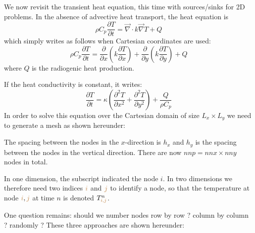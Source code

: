 We now revisit the transient heat equation, this time with sources/sinks for 2D problems.
In the absence of advective heat transport, the heat equation is 
\begin{equation}
\rho C_p \frac{\partial T}{\partial t} =
\vec\nabla \cdot k \vec\nabla T + Q 
\end{equation}
which simply writes as follows when Cartesian coordinates are used:
\begin{equation}
\rho C_p \frac{\partial T}{\partial t} = 
\frac{\partial }{\partial x} \left(  k  \frac{\partial T}{\partial x} \right)+
\frac{\partial }{\partial y} \left(  k  \frac{\partial T}{\partial y} \right)+ Q
\end{equation}
where $Q$ is the radiogenic heat production.

If the heat conductivity is constant, it writes:
\begin{equation}
\frac{\partial T}{\partial t} =
\kappa \left(  \frac{\partial^2 T}{\partial x^2} + \frac{\partial^2 T}{\partial y^2} \right)+
\frac{Q}{\rho C_p}
\end{equation}
In order to solve this equation over the Cartesian domain of size $L_x \times L_y$
we need to generate a mesh as shown hereunder:

\begin{minipage}[t]{\textwidth}
\begin{center}

\end{center}
\end{minipage}

The spacing between the nodes in the $x$-direction is $h_x$ and $h_y$ is the spacing
between the nodes in the vertical direction. There are now $nnp=nnx\times nny$ nodes in total.

In one dimension, the subscript indicated the node $i$. In two dimensions we therefore 
need two indices ${\color{brown}i}$ and ${\color{brown}j}$ 
to identify a node, so that the temperature at node ${\color{brown}i},{\color{brown}j}$ 
at time $n$ is denoted $T_{{\color{brown}i,j}}^n$.

One question remains: should we number nodes 
row by row ? column by column ? randomly ? 
These three approaches are shown hereunder: 

\vspace{.5cm}

